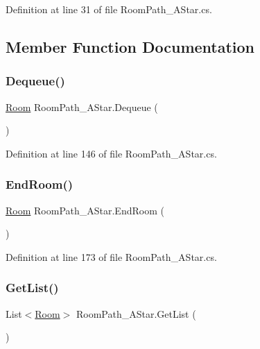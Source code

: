 Definition at line 31 of file Room\+Path\+\_\+\+A\+Star.\+cs.



\subsection{Member Function Documentation}
\mbox{\label{class_room_path___a_star_aabed126d8b7afbc72f1817a8360d5829}} 
\subsubsection{\texorpdfstring{Dequeue()}{Dequeue()}}
{\footnotesize\ttfamily \hyperlink{class_project_porcupine_1_1_rooms_1_1_room}{Room} Room\+Path\+\_\+\+A\+Star.\+Dequeue (\begin{DoxyParamCaption}{ }\end{DoxyParamCaption})}



Definition at line 146 of file Room\+Path\+\_\+\+A\+Star.\+cs.

\mbox{\label{class_room_path___a_star_a105a63aa51bd48c7f50196f530421c9b}} 
\subsubsection{\texorpdfstring{End\+Room()}{EndRoom()}}
{\footnotesize\ttfamily \hyperlink{class_project_porcupine_1_1_rooms_1_1_room}{Room} Room\+Path\+\_\+\+A\+Star.\+End\+Room (\begin{DoxyParamCaption}{ }\end{DoxyParamCaption})}



Definition at line 173 of file Room\+Path\+\_\+\+A\+Star.\+cs.

\mbox{\label{class_room_path___a_star_a32701223a03daa4db393811bc5709364}} 
\subsubsection{\texorpdfstring{Get\+List()}{GetList()}}
{\footnotesize\ttfamily List$<$\hyperlink{class_project_porcupine_1_1_rooms_1_1_room}{Room}$>$ Room\+Path\+\_\+\+A\+Star.\+Get\+List (\begin{DoxyParamCaption}{ }\end{DoxyParamCaption})}




